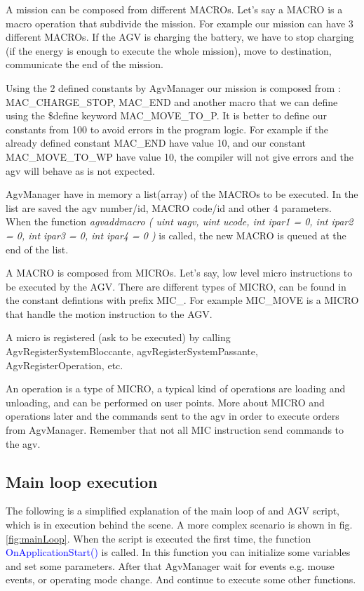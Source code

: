 A mission can be composed from different MACROs. Let's say a MACRO is a macro operation that subdivide the mission. For example our mission can have 3 different MACROs. If the AGV is charging the battery, we have to stop charging (if the energy is enough to execute the whole mission), move to destination, communicate the end of the mission.

Using the 2 defined constants by AgvManager our mission is composed from : MAC\_CHARGE\_STOP, MAC\_END and another macro that we can define using the \$define keyword MAC\_MOVE\_TO\_P.
It is better to define our constants from 100 to avoid errors in the program logic. For example if the already defined constant MAC\_END have value 10, and our constant MAC\_MOVE\_TO\_WP have value 10, the compiler will not give errors and the agv will behave as is not expected.

AgvManager have in memory a list(array) of the MACROs to be executed. In the list are saved the agv number/id, MACRO code/id and other 4 parameters. 
When the function 
\textit{agvaddmacro	(	uint 	uagv,
	uint 	ucode,
	int 	ipar1 = 0,
	int 	ipar2 = 0,
	int 	ipar3 = 0,
	int 	ipar4 = 0 
	)		} 
is called, the new MACRO is queued at the end of the list.

A MACRO is composed from MICROs. Let's say, low level micro instructions to be executed by the AGV. There are different types of MICRO, can be found in the constant defintions with prefix MIC\_. For example MIC\_MOVE is a MICRO that handle the motion instruction to the AGV.

A micro is registered (ask to be executed) by calling AgvRegisterSystemBloccante, agvRegisterSystemPassante, AgvRegisterOperation, etc.

An operation is a type of MICRO, a typical kind of operations are loading and unloading, and can be performed on user points.
More about MICRO and operations later and the commands sent to the agv in order to execute orders from AgvManager. Remember that not all MIC instruction send commands to the agv. 

\subsection{Main loop execution}
The following is a simplified explanation of the main loop of and AGV script, which is in execution behind the scene. A more complex scenario is shown in fig.\ref{fig:mainLoop}.
When the script is executed the first time, the function \textcolor{blue}{OnApplicationStart()} is called. In this function you can initialize some variables and set some parameters. After that AgvManager wait for events e.g. mouse events, or operating mode change. And continue to execute some other functions.

